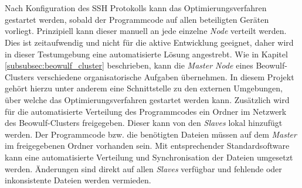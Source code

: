 \\\\
Nach Konfiguration des \ac{SSH} Protokolls kann das Optimierungsverfahren gestartet werden, sobald der Programmcode auf allen beteiligten Geräten vorliegt. Prinzipiell kann dieser manuell an jede einzelne \emph{Node} verteilt werden. Dies ist zeitaufwendig und nicht für die aktive Entwicklung geeignet, daher wird in dieser Testumgebung eine automatisierte Lösung angestrebt. Wie in Kapitel \ref{subsubsec:beowulf_cluster} beschrieben, kann die \emph{Master Node} eines Beowulf-Clusters verschiedene organisatorische Aufgaben übernehmen. In diesem Projekt gehört hierzu unter anderem eine Schnittstelle zu den externen Umgebungen, über welche das Optimierungsverfahren gestartet werden kann. Zusätzlich wird für die automatisierte Verteilung des Programmcodes ein Ordner im Netzwerk des Beowulf-Clusters freigegeben. Dieser kann von den \emph{Slaves} lokal hinzufügt werden. Der Programmcode bzw. die benötigten Dateien müssen auf dem \emph{Master} im freigegebenen Ordner vorhanden sein. Mit entsprechender Standardsoftware kann eine automatisierte Verteilung und Synchronisation der Dateien umgesetzt werden. Änderungen sind direkt auf allen \emph{Slaves} verfügbar und fehlende oder inkonsistente Dateien werden vermieden.
